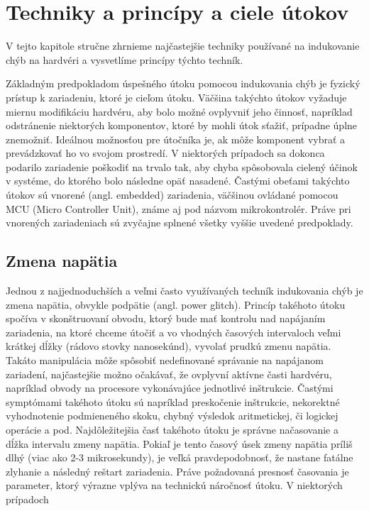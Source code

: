 \chapter{Techniky a princípy a ciele útokov}

\label{kap:teoria} %

V tejto kapitole stručne zhrnieme najčastejšie techniky používané na indukovanie chýb na hardvéri a vysvetlíme princípy týchto techník.

Základným predpokladom úspešného útoku pomocou indukovania chýb je fyzický prístup k zariadeniu, ktoré je cieľom útoku. Väčšina takýchto útokov vyžaduje miernu modifikáciu hardvéru, aby bolo možné ovplyvniť jeho činnosť, napríklad odstránenie niektorých komponentov, ktoré by mohli útok sťažiť, prípadne úplne znemožniť. Ideálnou možnosťou pre útočníka je, ak môže komponent vybrať a prevádzkovať ho vo svojom prostredí. V niektorých prípadoch sa dokonca podarilo zariadenie poškodiť na trvalo tak, aby chyba spôsobovala cielený účinok v systéme, do ktorého bolo následne opäť nasadené. Častými obeťami takýchto útokov sú vnorené (angl. embedded) zariadenia, väčšinou ovládané pomocou MCU (Micro Controller Unit), známe aj pod názvom mikrokontrolér. Práve pri vnorených zariadeniach sú zvyčajne splnené všetky vyššie uvedené predpoklady. 

\section{Zmena napätia}
Jednou z najjednoduchších a veľmi často využívaných techník indukovania chýb je zmena napätia, obvykle podpätie (angl. power glitch). Princíp takéhoto útoku spočíva v skonštruovaní obvodu, ktorý bude mať kontrolu nad napájaním zariadenia, na ktoré chceme útočiť a vo vhodných časových intervaloch veľmi krátkej dĺžky (rádovo stovky nanosekúnd), vyvolať prudkú zmenu napätia. Takáto manipulácia môže spôsobiť nedefinované správanie na napájanom zariadení, najčastejšie možno očakávať, že ovplyvní aktívne časti hardvéru, napríklad obvody na procesore vykonávajúce jednotlivé inštrukcie. Častými symptómami takéhoto útoku sú napríklad preskočenie inštrukcie, nekorektné vyhodnotenie podmieneného skoku, chybný výsledok aritmetickej, či logickej operácie a pod. Najdôležitejšia časť takéhoto útoku je správne načasovanie a dĺžka intervalu zmeny napätia. Pokiaľ je tento časový úsek zmeny napätia príliš dlhý (viac ako 2-3 mikrosekundy), je veľká pravdepodobnosť, že nastane fatálne zlyhanie a následný reštart zariadenia. Práve požadovaná presnosť časovania je parameter, ktorý výrazne vplýva na technickú náročnosť útoku. V niektorých prípadoch 

